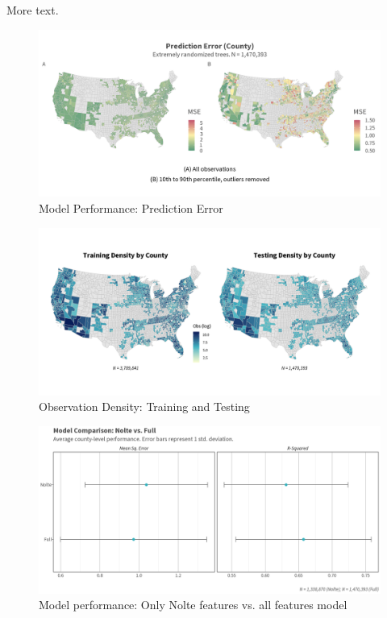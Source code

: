 \documentclass[12pt]{article}
\begin{document}
More text.

\begin{figure}
    \centering
    \includegraphics[width=6in]{figures/rf_mse_map.png}
    \caption{Model Performance: Prediction Error}
    \label{fig:mse_county}
\end{figure}

\newpage

\begin{figure}
    \centering
    \includegraphics[width=6in]{figures/test_train_density.png}
    \caption{Observation Density: Training and Testing}
    \label{fig:train_test}
\end{figure}

\newpage

\begin{figure}
    \centering
    \includegraphics[width=6in]{figures/nolte_full_compare.png}
    \caption{Model performance: Only Nolte features vs. all features model}
    \label{fig:nolte_full_compare}
\end{figure}
\end{document}
